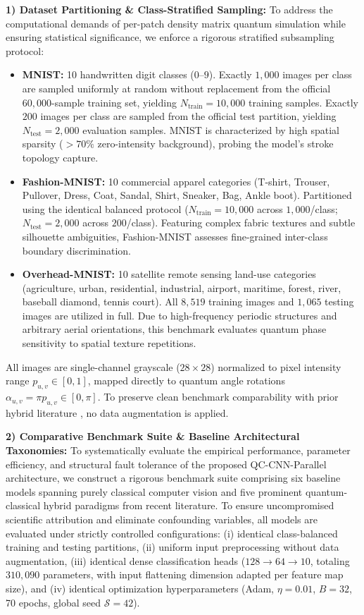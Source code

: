 \documentclass[pdflatex,sn-mathphys-num]{sn-jnl}%
\theoremstyle{thmstyleone}%
\theoremstyle{thmstyletwo}%
\theoremstyle{thmstylethree}%
\begin{document}
\textbf{1) Dataset Partitioning \& Class-Stratified Sampling:}
To address the computational demands of per-patch density matrix quantum simulation while ensuring statistical significance, we enforce a rigorous stratified subsampling protocol:
\begin{itemize}
    \item \textbf{MNIST:} 10 handwritten digit classes ($0$--$9$). Exactly $1{,}000$ images per class are sampled uniformly at random without replacement from the official $60{,}000$-sample training set, yielding $N_{\mathrm{train}} = 10{,}000$ training samples. Exactly $200$ images per class are sampled from the official test partition, yielding $N_{\mathrm{test}} = 2{,}000$ evaluation samples. MNIST is characterized by high spatial sparsity (${>}70\%$ zero-intensity background), probing the model's stroke topology capture.
    \item \textbf{Fashion-MNIST:} 10 commercial apparel categories (T-shirt, Trouser, Pullover, Dress, Coat, Sandal, Shirt, Sneaker, Bag, Ankle boot). Partitioned using the identical balanced protocol ($N_{\mathrm{train}} = 10{,}000$ across $1{,}000$/class; $N_{\mathrm{test}} = 2{,}000$ across $200$/class). Featuring complex fabric textures and subtle silhouette ambiguities, Fashion-MNIST assesses fine-grained inter-class boundary discrimination.
    \item \textbf{Overhead-MNIST:} 10 satellite remote sensing land-use categories (agriculture, urban, residential, industrial, airport, maritime, forest, river, baseball diamond, tennis court). All $8{,}519$ training images and $1{,}065$ testing images are utilized in full. Due to high-frequency periodic structures and arbitrary aerial orientations, this benchmark evaluates quantum phase sensitivity to spatial texture repetitions.
\end{itemize}
All images are single-channel grayscale ($28 \times 28$) normalized to pixel intensity range $p_{u,v} \in [0, 1]$, mapped directly to quantum angle rotations $\alpha_{u,v} = \pi p_{u,v} \in [0, \pi]$. To preserve clean benchmark comparability with prior hybrid literature \cite{henderson2020quanvolutional, senokosov2024quantum}, no data augmentation is applied.

\textbf{2) Comparative Benchmark Suite \& Baseline Architectural Taxonomies:}
To systematically evaluate the empirical performance, parameter efficiency, and structural fault tolerance of the proposed QC-CNN-Parallel architecture, we construct a rigorous benchmark suite comprising six baseline models spanning purely classical computer vision and five prominent quantum-classical hybrid paradigms from recent literature. To ensure uncompromised scientific attribution and eliminate confounding variables, all models are evaluated under strictly controlled configurations: (i) identical class-balanced training and testing partitions, (ii) uniform input preprocessing without data augmentation, (iii) identical dense classification heads ($128 \to 64 \to 10$, totaling $310{,}090$ parameters, with input flattening dimension adapted per feature map size), and (iv) identical optimization hyperparameters (Adam, $\eta = 0.01$, $B = 32$, 70 epochs, global seed $\mathcal{S}=42$).
\end{document}
